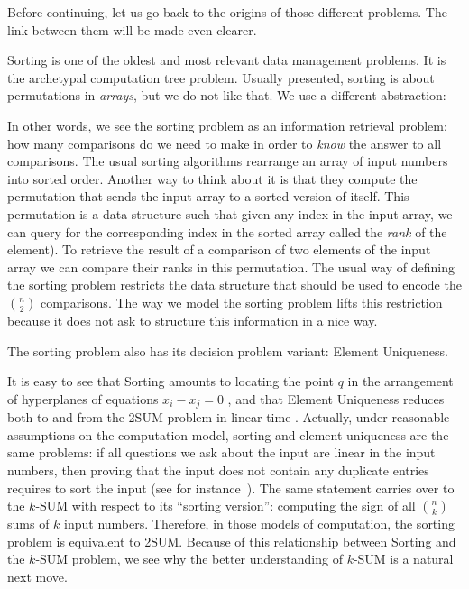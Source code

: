 
Before continuing, let us go back to the origins of those different problems.
The link between them will be made even clearer.

Sorting is one of the oldest and most relevant data management problems.
It is the archetypal computation tree problem.
%
Usually presented, sorting is about permutations in \emph{arrays}, but we do
not like that. We use a different abstraction:
%


In other words, we see the sorting problem as an information retrieval problem:
how many comparisons do we need to make in order to \emph{know} the answer to
all comparisons.
%
The usual sorting algorithms rearrange an array of input numbers into sorted
order. Another way to think about it is that they compute the permutation that
sends the input array to a sorted version of itself. This permutation is a data
structure such that given any index in the input array, we can query for the
corresponding index in the sorted array called the \emph{rank} of the element).
To retrieve the result of a comparison of two elements of the input array we can
compare their ranks in this permutation.
%
The usual way of defining the sorting problem restricts the data structure that
should be used to encode the \(n \choose 2\) comparisons.
The way we model the sorting problem lifts this restriction because it does not
ask to structure this information in a nice way.

The sorting problem also has its decision problem variant: Element Uniqueness.
%


It is easy to see
%
that Sorting amounts to locating the point \(q\) in
the arrangement of hyperplanes of equations \(x_i - x_j = 0\)%
%
, and
%
that Element Uniqueness reduces both to and from the 2SUM
problem in linear time%
.
%
Actually, under reasonable assumptions on the computation model, sorting and
element uniqueness are the same problems: if all questions we ask about the
input are linear in the input numbers, then proving that the input
does not contain any duplicate entries requires to sort the input (see for
instance~\cite{DL78,DL79}).
%
The same statement carries over to the \(k\)-SUM with respect to its ``sorting
version'': computing the sign of all \(n \choose k\) sums of \(k\) input
numbers.
%
Therefore, in those models of computation, the sorting problem is equivalent to
2SUM.
%
Because of this relationship between Sorting and the \(k\)-SUM problem,
we see why the better understanding of \(k\)-SUM is a natural next move.

